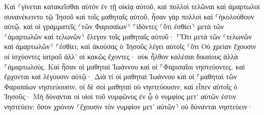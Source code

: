 \documentclass{openreader}
\begin{document}
Καὶ ⸀γίνεται κατακεῖσθαι αὐτὸν ἐν τῇ οἰκίᾳ αὐτοῦ, καὶ πολλοὶ τελῶναι καὶ ἁμαρτωλοὶ συνανέκειντο τῷ Ἰησοῦ καὶ τοῖς μαθηταῖς αὐτοῦ, ἦσαν γὰρ πολλοὶ καὶ ⸀ἠκολούθουν αὐτῷ. 
καὶ οἱ γραμματεῖς ⸂τῶν Φαρισαίων⸃ ⸀ἰδόντες ⸂ὅτι ἐσθίει⸃ μετὰ τῶν ⸂ἁμαρτωλῶν καὶ τελωνῶν⸃ ἔλεγον τοῖς μαθηταῖς αὐτοῦ· ⸀Ὅτι μετὰ τῶν ⸂τελωνῶν καὶ ἁμαρτωλῶν⸃ ⸀ἐσθίει; 
καὶ ἀκούσας ὁ Ἰησοῦς λέγει αὐτοῖς ⸀ὅτι Οὐ χρείαν ἔχουσιν οἱ ἰσχύοντες ἰατροῦ ἀλλ’ οἱ κακῶς ἔχοντες· οὐκ ἦλθον καλέσαι δικαίους ἀλλὰ ⸀ἁμαρτωλούς. 
Καὶ ἦσαν οἱ μαθηταὶ Ἰωάννου καὶ οἱ ⸀Φαρισαῖοι νηστεύοντες. καὶ ἔρχονται καὶ λέγουσιν αὐτῷ· Διὰ τί οἱ μαθηταὶ Ἰωάννου καὶ οἱ ⸀μαθηταὶ τῶν Φαρισαίων νηστεύουσιν, οἱ δὲ σοὶ μαθηταὶ οὐ νηστεύουσιν; 
καὶ εἶπεν αὐτοῖς ὁ Ἰησοῦς· Μὴ δύνανται οἱ υἱοὶ τοῦ νυμφῶνος ἐν ᾧ ὁ νυμφίος μετ’ αὐτῶν ἐστιν νηστεύειν; ὅσον χρόνον ⸂ἔχουσιν τὸν νυμφίον μετ’ αὐτῶν⸃ οὐ δύνανται νηστεύειν· 
\end{document}
